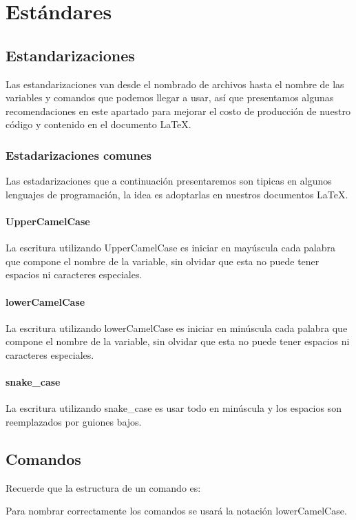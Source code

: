 \chapter{Estándares}
{\justifying
		\section{Estandarizaciones}
		Las estandarizaciones van desde el nombrado de archivos hasta el nombre de las variables y comandos que podemos llegar a usar, así que presentamos algunas recomendaciones en este apartado para mejorar el costo de producción de nuestro código y contenido en el documento \LaTeX.
		\subsection{Estadarizaciones comunes}
			Las estadarizaciones que a continuación presentaremos son tipicas en algunos lenguajes de programación, la idea es adoptarlas en nuestros documentos \LaTeX.
			\subsubsection{UpperCamelCase}
				La escritura utilizando UpperCamelCase es iniciar en mayúscula cada palabra que compone el nombre de la variable, sin olvidar que esta no puede tener espacios ni caracteres especiales. 
			\subsubsection{lowerCamelCase}
				La escritura utilizando lowerCamelCase es iniciar en minúscula cada palabra que compone el nombre de la variable, sin olvidar que esta no puede tener espacios ni caracteres especiales.
			\subsubsection{snake\_case}
				La escritura utilizando snake\_case es usar todo en minúscula y los espacios son reemplazados por guiones bajos. 
			\section{Comandos}
			Recuerde que la estructura de un comando es:
			\begin{center}
			\end{center}
			Para nombrar correctamente los comandos se usará la notación lowerCamelCase.
}
